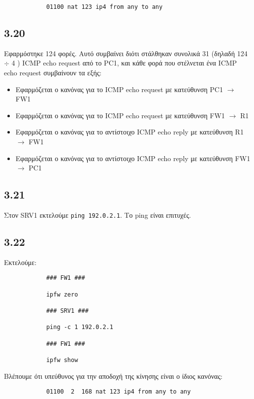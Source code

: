 \documentclass[a4paper, 12pt]{article}
\begin{document}
		\begin{verbatim}
			01100 nat 123 ip4 from any to any
		\end{verbatim}

	\subsection*{3.20}
		Εφαρμόστηκε 124 φορές. Αυτό συμβαίνει διότι στάλθηκαν συνολικά 31 (δηλαδή 124 $\div$ 4 ) ICMP echo request από το PC1, και κάθε φορά που στέλνεται ένα ICMP echo request συμβαίνουν τα εξής:
		
		\begin{itemize}
			\item Εφαρμόζεται ο κανόνας για το ICMP echo request με κατεύθυνση PC1 $\rightarrow$ FW1
			\item Εφαρμόζεται ο κανόνας για το ICMP echo request με κατεύθυνση FW1 $\rightarrow$ R1
			\item Εφαρμόζεται ο κανόνας για το αντίστοιχο ICMP echo reply με κατεύθυνση R1 $\rightarrow$ FW1
			\item Εφαρμόζεται ο κανόνας για το αντίστοιχο ICMP echo reply με κατεύθυνση FW1 $\rightarrow$ PC1 
		\end{itemize}
		
	\subsection*{3.21}
		Στον SRV1 εκτελούμε \verb|ping 192.0.2.1|. Το ping είναι επιτυχές.

	\subsection*{3.22}
		Εκτελούμε:
		
		\begin{verbatim}
			### FW1 ###
			
			ipfw zero
			
			### SRV1 ###
			
			ping -c 1 192.0.2.1
			
			### FW1 ###
			
			ipfw show
		\end{verbatim}
		
		Βλέπουμε ότι υπεύθυνος για την αποδοχή της κίνησης είναι ο ίδιος κανόνας:
		
		\begin{verbatim}
			01100  2  168 nat 123 ip4 from any to any
		\end{verbatim}
		
\end{document}
